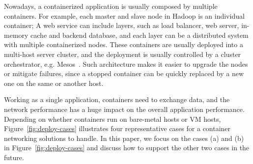 Nowadays, a containerized application is usually composed by multiple containers. For example, each master and slave node in Hadoop is an individual container; A web service can include layers, such as load balancer, web server,
in-memory cache and backend database, and each layer can be a distributed 
system with multiple containerized nodes. 
These containers are usually 
deployed into a multi-host server cluster, and the deployment is usually 
controlled by a cluster orchestrator, e.g. Mesos~\cite{?}. 
Such architecture makes it easier
to upgrade the nodes or mitigate failures, since a stopped container can be quickly replaced by a new one on the same or another host.

Working as a single application, containers need to exchange data, and the network performance has a huge impact on the overall application performance.
Depending on whether 
containers run on bare-metal hosts or VM hosts, Figure~\ref{fig:deploy-cases}
illustrates four representative cases for a container networking solutions
to handle. 
In this paper, 
we focus on the cases (a) and (b) in Figure~\ref{fig:deploy-cases} and discuss how to support the other two cases in the future.




